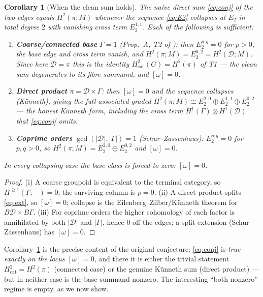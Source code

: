 \documentclass[11pt]{article}
\newtheorem{corollary}[theorem]{Corollary}
\theoremstyle{definition}
\newcommand{\D}{\mathcal{D}}
\begin{document}
\begin{corollary}[When the clean sum holds]\label{cor:collapse}
The naive direct sum \eqref{eq:conj} of the two edges equals $H^2(\pi;M)$
whenever the sequence \eqref{eq:E2} collapses at $E_2$ in total degree $2$ with
vanishing cross term $E_2^{1,1}$. Each of the following is sufficient:
\begin{enumerate}
\item[\textup{(i)}] \textbf{Coarse/connected base} $\Gamma=1$
\textup{(}Prop.~A, T2 of \cite{sep2}\textup{)}: then $E_2^{p,q}=0$ for $p>0$, the
base edge and cross term vanish, and $H^2(\pi;M)=E_2^{0,2}=H^2(\D;M)$. Since here
$\D=\pi$ this is the identity $H^2_{\mathrm{cat}}(G)=H^2(\pi)$ of T1 --- the clean
sum degenerates to its fibre summand, and $[\omega]=0$.
\item[\textup{(ii)}] \textbf{Direct product} $\pi=\D\times\Gamma$: then $[\omega]=0$
and the sequence collapses (Künneth), giving the \emph{full} associated graded
$H^2(\pi;M)\cong E_2^{2,0}\oplus E_2^{1,1}\oplus E_2^{0,2}$ --- the honest
Künneth form, including the cross term $H^1(\Gamma)\otimes H^1(\D)$ that
\eqref{eq:conj} omits.
\item[\textup{(iii)}] \textbf{Coprime orders} $\gcd(|\D|,|\Gamma|)=1$
\textup{(}Schur--Zassenhaus\textup{)}: $E_2^{p,q}=0$ for $p,q>0$, so
$H^2(\pi;M)=E_2^{2,0}\oplus E_2^{0,2}$ and $[\omega]=0$.
\end{enumerate}
In every collapsing case the base class is forced to zero: $[\omega]=0$.
\end{corollary}
\begin{proof}
(i) A coarse groupoid is equivalent to the terminal category, so
$H^{\ge1}(\Gamma;-)=0$; the surviving column is $p=0$. (ii) A direct product
splits \eqref{eq:ext}, so $[\omega]=0$; collapse is the Eilenberg--Zilber/Künneth
theorem for $B\D\times B\Gamma$. (iii) For coprime orders the higher cohomology
of each factor is annihilated by both $|\D|$ and $|\Gamma|$, hence $0$ off the
edges; a split extension (Schur--Zassenhaus) has $[\omega]=0$.
\end{proof}

Corollary~\ref{cor:collapse} is the precise content of the original conjecture:
\eqref{eq:conj} is \emph{true exactly on the locus $[\omega]=0$}, and there it is
either the trivial statement $H^2_{\mathrm{cat}}=H^2(\pi)$ (connected case) or
the genuine Künneth sum (direct product) --- but in neither case is the base
summand nonzero. The interesting ``both nonzero'' regime is empty, as we now
show.
\end{document}
